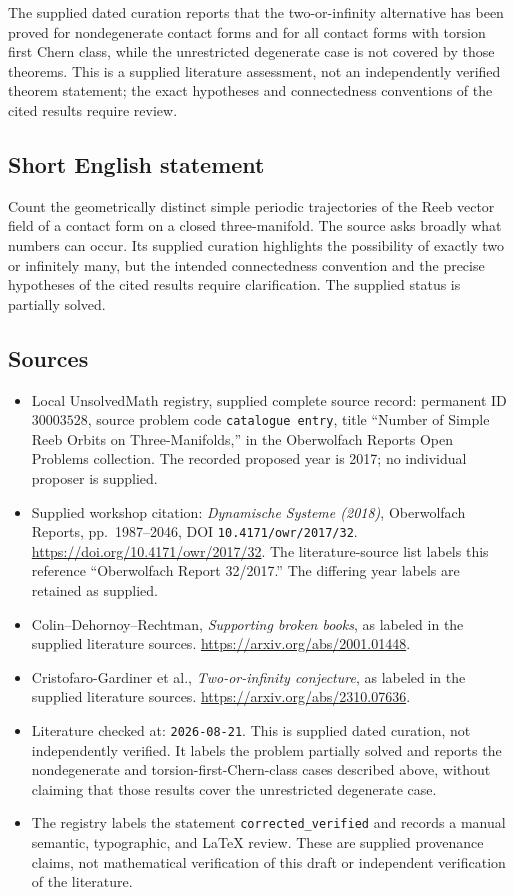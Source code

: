 \documentclass[11pt]{article}
\begin{document}
The supplied dated curation reports that the two-or-infinity alternative has been proved for nondegenerate contact forms and for all contact forms with torsion first Chern class, while the unrestricted degenerate case is not covered by those theorems. This is a supplied literature assessment, not an independently verified theorem statement; the exact hypotheses and connectedness conventions of the cited results require review.
\subsection{Short English statement}
Count the geometrically distinct simple periodic trajectories of the Reeb vector field of a contact form on a closed three-manifold. The source asks broadly what numbers can occur. Its supplied curation highlights the possibility of exactly two or infinitely many, but the intended connectedness convention and the precise hypotheses of the cited results require clarification. The supplied status is partially solved.
\subsection{Sources}
\begin{itemize}
\item Local UnsolvedMath registry, supplied complete source record: permanent ID \(30003528\), source problem code \texttt{catalogue entry}, title ``Number of Simple Reeb Orbits on Three-Manifolds,'' in the Oberwolfach Reports Open Problems collection. The recorded proposed year is 2017; no individual proposer is supplied.
\item Supplied workshop citation: \emph{Dynamische Systeme (2018)}, Oberwolfach Reports, pp.\ 1987--2046, DOI \texttt{10.4171/owr/2017/32}. \url{https://doi.org/10.4171/owr/2017/32}. The literature-source list labels this reference ``Oberwolfach Report 32/2017.'' The differing year labels are retained as supplied.
\item Colin--Dehornoy--Rechtman, \emph{Supporting broken books}, as labeled in the supplied literature sources. \url{https://arxiv.org/abs/2001.01448}.
\item Cristofaro-Gardiner et al., \emph{Two-or-infinity conjecture}, as labeled in the supplied literature sources. \url{https://arxiv.org/abs/2310.07636}.
\item Literature checked at: \texttt{2026-08-21}. This is supplied dated curation, not independently verified. It labels the problem partially solved and reports the nondegenerate and torsion-first-Chern-class cases described above, without claiming that those results cover the unrestricted degenerate case.
\item The registry labels the statement \texttt{corrected\_verified} and records a manual semantic, typographic, and LaTeX review. These are supplied provenance claims, not mathematical verification of this draft or independent verification of the literature.
\end{itemize}
\end{document}
